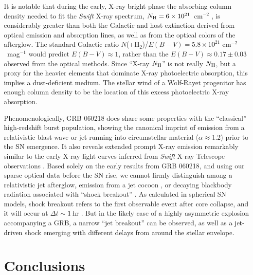 \documentclass[apj]{emulateapj}
\begin{document}
It is notable that during the early, X-ray bright phase
the absorbing column density needed to fit the {\it Swift\/} X-ray spectrum,
$N_{\rm H} = 6 \times 10^{21}$~cm$^{-2}$ \citep{campana},
is considerably greater than both the Galactic
and host extinction derived from optical emission and absorption lines,
as well as from the optical colors of the afterglow.
The standard Galactic ratio $N$(+H$_2$)/$E(B-V) = 
5.8 \times 10^{21}$ cm$^{-2}$~mag$^{-1}$ \citep{bohlin} would predict
$E(B-V) \approx 1$, rather than the
$E(B-V) \approx 0.17\pm0.03$ observed from the optical methods.
Since ``X-ray $N_{\rm H}$'' is not really $N_{\rm H}$, but a proxy for the 
heavier elements that dominate X-ray photoelectric absorption, this implies
a dust-deficient medium.  The stellar wind of a Wolf-Rayet progenitor
has enough column density to be the location of this excess photoelectric
X-ray absorption.

Phenomenologically, GRB 060218 does share some properties with the ``classical'' 
high-redshift burst population, showing the canonical imprint of emission
from a relativistic blast wave or jet running into circumstellar 
material ($\alpha \approx 1.2$) prior to the SN emergence. It also  
reveals extended prompt X-ray emission remarkably similar to
the early X-ray light curves inferred from {\it Swift\/} X-ray Telescope
observations \citep{zhang2}. Based solely on the early results from
GRB 060218, and using our sparse optical data before the SN rise,
we cannot firmly distinguish among a relativistic jet afterglow,
emission from a jet cocoon \citep{enrico}, or
decaying blackbody radiation associated with ``shock breakout''
\citep{campana}. As calculated in spherical SN models, 
shock breakout refers to the first
observable event after core collapse, and it will occur at $\Delta t
\sim 1~$hr \citep{arnett}.  But in the likely case of a highly asymmetric explosion
accompanying a GRB, a narrow ``jet breakout'' can be observed,
as well as a jet-driven shock emerging with different delays from around
the stellar envelope.  



\section{Conclusions}
\end{document}
